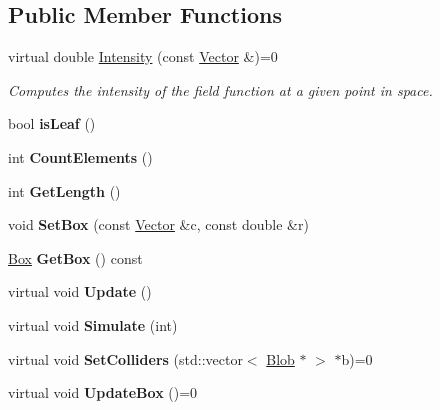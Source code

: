 \subsection*{Public Member Functions}
\begin{DoxyCompactItemize}
\item 
\hypertarget{class_blob_node_a4987f9060e9141647c514efd9859d0ba}{
virtual double \hyperlink{class_blob_node_a4987f9060e9141647c514efd9859d0ba}{Intensity} (const \hyperlink{class_vector}{Vector} \&)=0}
\label{class_blob_node_a4987f9060e9141647c514efd9859d0ba}

\begin{DoxyCompactList}\small\item\em Computes the intensity of the field function at a given point in space. \item\end{DoxyCompactList}\item 
\hypertarget{class_blob_node_a542d05d0c6348b26c78ebc193f066506}{
bool {\bfseries isLeaf} ()}
\label{class_blob_node_a542d05d0c6348b26c78ebc193f066506}

\item 
\hypertarget{class_blob_node_a413bd0ae9b5d29525e5144f07416d3b2}{
int {\bfseries CountElements} ()}
\label{class_blob_node_a413bd0ae9b5d29525e5144f07416d3b2}

\item 
\hypertarget{class_blob_node_a555ec4a4a6a7e3d1ce0d43b652277891}{
int {\bfseries GetLength} ()}
\label{class_blob_node_a555ec4a4a6a7e3d1ce0d43b652277891}

\item 
\hypertarget{class_blob_node_a927217bae2ccf26593e8a49b06e3a6c9}{
void {\bfseries SetBox} (const \hyperlink{class_vector}{Vector} \&c, const double \&r)}
\label{class_blob_node_a927217bae2ccf26593e8a49b06e3a6c9}

\item 
\hypertarget{class_blob_node_a3d683f1393164d06e83131226d55d69c}{
\hyperlink{class_box}{Box} {\bfseries GetBox} () const }
\label{class_blob_node_a3d683f1393164d06e83131226d55d69c}

\item 
\hypertarget{class_blob_node_a59a4a94b42af71a0a3d118115405b338}{
virtual void {\bfseries Update} ()}
\label{class_blob_node_a59a4a94b42af71a0a3d118115405b338}

\item 
\hypertarget{class_blob_node_a78e42272e883c751bf544d8a7f56a996}{
virtual void {\bfseries Simulate} (int)}
\label{class_blob_node_a78e42272e883c751bf544d8a7f56a996}

\item 
\hypertarget{class_blob_node_a31c79809f50a2e1dae8da6387e45d7e1}{
virtual void {\bfseries SetColliders} (std::vector$<$ \hyperlink{class_blob}{Blob} $\ast$ $>$ $\ast$b)=0}
\label{class_blob_node_a31c79809f50a2e1dae8da6387e45d7e1}

\item 
\hypertarget{class_blob_node_a7dfe920da7568ba478cae187f43eed7b}{
virtual void {\bfseries UpdateBox} ()=0}
\label{class_blob_node_a7dfe920da7568ba478cae187f43eed7b}

\end{DoxyCompactItemize}
